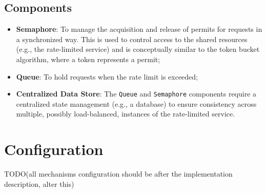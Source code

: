 \subsection{Components}\label{subsec:rate-limiter-components}

\begin{itemize}
    \item \textbf{Semaphore}: To manage the acquisition and release of permits for requests in a synchronized way.
    This is used to control access to the shared resources (e.g., the rate-limited service) and is conceptually similar to the token bucket algorithm, where a token represents a permit;
    \item \textbf{Queue}: To hold requests when the rate limit is exceeded;
    \item \textbf{Centralized Data Store}: The \texttt{Queue} and \texttt{Semaphore} components require a centralized state management (e.g., a database) to ensure consistency across multiple, possibly load-balanced, instances of the rate-limited service.
\end{itemize}


\section{Configuration}\label{sec:rate-limiter-configuration}

TODO(all mechanisms configuration should be after the implementation description, alter this)
